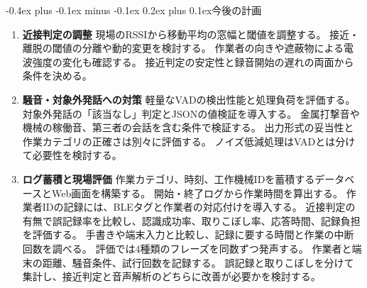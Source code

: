 \documentclass[a4paper,10pt,twocolumn,ja=standard,lualatex,geometry=user]{bxjsarticle}
\makeatletter
\renewcommand{\section}{\@startsection{section}{1}{\z@}%
  {-0.4ex plus -0.1ex minus -0.1ex}%
  {0.2ex plus 0.1ex}{\normalfont\large\bfseries}}
\makeatother
\begin{document}
\section{今後の計画}
\begin{enumerate}
  \item \textbf{近接判定の調整}\quad
  現場のRSSIから移動平均の窓幅と閾値を調整する。
  接近・離脱の閾値の分離や動的変更を検討する。
  作業者の向きや遮蔽物による電波強度の変化も確認する。
  接近判定の安定性と録音開始の遅れの両面から条件を決める。

  \item \textbf{騒音・対象外発話への対策}\quad
  軽量なVADの検出性能と処理負荷を評価する。
  対象外発話の「該当なし」判定とJSONの値検証を導入する。
  金属打撃音や機械の稼働音、第三者の会話を含む条件で検証する。
  出力形式の妥当性と作業カテゴリの正確さは別々に評価する。
  ノイズ低減処理はVADとは分けて必要性を検討する。

  \item \textbf{ログ蓄積と現場評価}\quad
  作業カテゴリ、時刻、工作機械IDを蓄積するデータベースとWeb画面を構築する。
  開始・終了ログから作業時間を算出する。
  作業者IDの記録には、BLEタグと作業者の対応付けを導入する。
  近接判定の有無で誤記録率を比較し、認識成功率、取りこぼし率、応答時間、記録負担を評価する。
  手書きや端末入力と比較し、記録に要する時間と作業の中断回数を調べる。
  評価では4種類のフレーズを同数ずつ発声する。
  作業者と端末の距離、騒音条件、試行回数を記録する。
  誤記録と取りこぼしを分けて集計し、接近判定と音声解析のどちらに改善が必要かを検討する。
\end{enumerate}

\begingroup
\small


\endgroup
\end{document}
